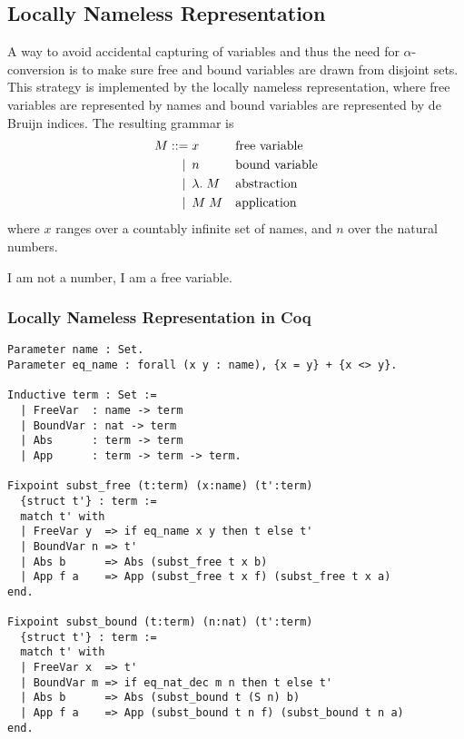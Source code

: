\documentclass[a4paper,11pt]{article}
\begin{document}
\subsection{Locally Nameless Representation}

A way to avoid accidental capturing of variables and thus the need for
$\alpha$-conversion is to make sure free and bound variables are drawn
from disjoint sets.
This strategy is implemented by the locally nameless representation,
where free variables are represented by names and bound variables are
represented by de Bruijn indices.
The resulting grammar is
\begin{align*}
  M ::=             &\; x
  && \text{free variable} \\
  \llap{\textbar\:} &\; n
  && \text{bound variable} \\
  \llap{\textbar\:} &\; \lambda . \; M
    && \text{abstraction} \\
  \llap{\textbar\:} &\; M \; M
  && \text{application}
\end{align*}
where $x$ ranges over a countably infinite set of names, and $n$ over
the natural numbers.

I am not a number, I am a free variable.

\subsubsection*{Locally Nameless Representation in Coq}

\begin{lstlisting}
Parameter name : Set.
Parameter eq_name : forall (x y : name), {x = y} + {x <> y}.

Inductive term : Set :=
  | FreeVar  : name -> term
  | BoundVar : nat -> term
  | Abs      : term -> term
  | App      : term -> term -> term.

Fixpoint subst_free (t:term) (x:name) (t':term)
  {struct t'} : term :=
  match t' with
  | FreeVar y  => if eq_name x y then t else t'
  | BoundVar n => t'
  | Abs b      => Abs (subst_free t x b)
  | App f a    => App (subst_free t x f) (subst_free t x a)
end.

Fixpoint subst_bound (t:term) (n:nat) (t':term)
  {struct t'} : term :=
  match t' with
  | FreeVar x  => t'
  | BoundVar m => if eq_nat_dec m n then t else t'
  | Abs b      => Abs (subst_bound t (S n) b)
  | App f a    => App (subst_bound t n f) (subst_bound t n a)
end.
\end{lstlisting}
\end{document}
